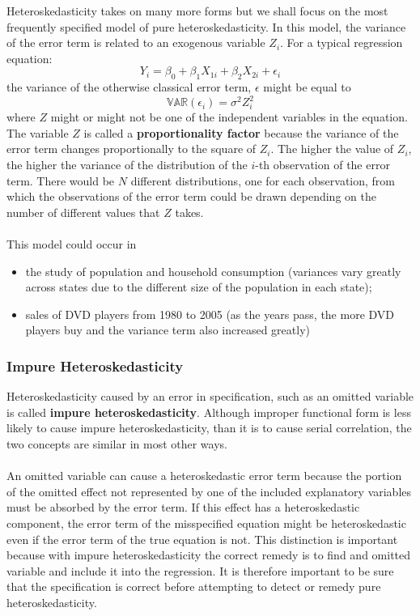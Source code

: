 \documentclass[11pt]{article}
\begin{document}
Heteroskedasticity takes on many more forms but we shall focus on the most frequently specified model of pure heteroskedasticity. In this model, the variance of the error term is related to an exogenous variable $Z_i$. For a typical regression equation:
\begin{equation}
Y_i = \beta_0 + \beta_1X_{1i} + \beta_2X_{2i} + \epsilon_i \label{eg10_3}
\end{equation}
the variance of the otherwise classical error term, $\epsilon$ might be equal to
\begin{equation}
\mathbb{VAR}(\epsilon_i) = \sigma^2 Z_i^2 \label{eg10_4}
\end{equation}
where $Z$ might or might not be one of the independent variables in the equation. The variable $Z$ is called a \textbf{proportionality factor} because the variance of the error term changes proportionally to the square of $Z_i$. The higher the value of $Z_i$, the higher the variance of the distribution of the $i$-th observation of the error term. There would be $N$ different distributions, one for each observation, from which the observations of the error term could be drawn depending on the number of different values that $Z$ takes. \\ \\
This model could occur in 
\begin{itemize}
\item the study of population and household consumption (variances vary greatly across states due to the different size of the population in each state);
\item sales of DVD players from 1980 to 2005 (as the years pass, the more DVD players buy and the variance term also increased greatly)
\end{itemize}
\subsubsection{Impure Heteroskedasticity}
Heteroskedasticity caused by an error in specification, such as an omitted variable is called \textbf{impure heteroskedasticity}. Although improper functional form is less likely to cause impure heteroskedasticity, than it is to cause serial correlation, the two concepts are similar in most other ways. \\ \\
An omitted variable can cause a heteroskedastic error term because the portion of the omitted effect not represented by one of the included explanatory variables must be absorbed by the error term. If this effect has a heteroskedastic component, the error term of the misspecified equation might be heteroskedastic even if the error term of the true equation is not. This distinction is important because with impure heteroskedasticity the correct remedy is to find and omitted variable and include it into the regression. It is therefore important to be sure that the specification is correct before attempting to detect or remedy pure heteroskedasticity.
\end{document}
